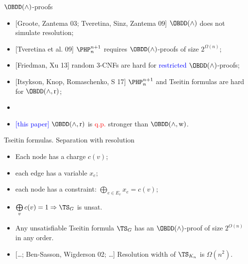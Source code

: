 \begin{frame}{$\OBDD(\land)$-proofs}
    \begin{itemize}
        \item{} [Groote, Zantema 03; Tveretina, Sinz, Zantema 09] $\OBDD(\land)$ does not simulate
            resolution;
        \pause
        \item{} [Tveretina et al. 09] $\PHP^{n + 1}_n$ requires $\OBDD(\land)$-proofs of size
            $2^{\Omega(n)}$;
        \pause
        \item{} [Friedman, Xu 13] random $3$-CNFs are hard for \textcolor{blue}{restricted}
            $\OBDD(\land)$-proofs;
        \pause
        \item{} [Itsykson, Knop, Romaschenko, S 17] $\PHP^{n + 1}_{n}$ and Tseitin formulas are hard for
            $\OBDD(\land, \reordering)$;
        \pause
        \item{} 
        \pause
        \pause    
        \item{} \textcolor{blue}{[this paper]} $\OBDD(\land, \reordering)$ is \textcolor{red}{q.p.}
            stronger than $\OBDD(\land, \weakening)$.
    \end{itemize}    
\end{frame}


\begin{frame}{Tseitin formulas. Separation with resolution}

    \begin{minipage}{0.5 \linewidth}
        
    \end{minipage}%
    \begin{minipage}{0.5 \linewidth}
        \begin{itemize}
            \item Each node has a charge $c(v)$;
            \item each edge has a variable $x_e$;
            \item each node has a constraint: $\bigoplus\limits_{e \in E_v} x_{e} = c(v)$;
            \item $\bigoplus\limits_{v} c(v) = 1 \Rightarrow \TS_G$ is unsat. 
        \end{itemize}
    \end{minipage}


    \pause
    \begin{itemize}
        \item Any unsatisfiable Tseitin formula $\TS_{G}$ has an $\OBDD(\land)$-proof of size $2^{O(n)}$
            in any order.
        \item{} [\dots; Ben-Sasson, Wigderson 02; \dots] Resolution width of $\TS_{K_n}$ is $\Omega(n^2)$.
    \end{itemize}
\end{frame}


